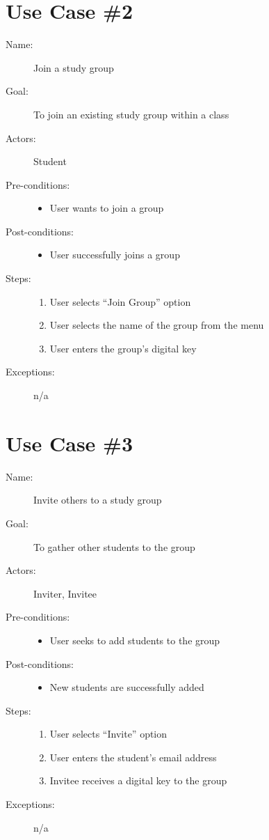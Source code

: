 \section{Use Case \#2}
	\begin{description}
		\item[Name:] Join a study group
		\item[Goal:] To join an existing study group within a class
		\item[Actors:] Student
		\item[Pre-conditions:]
		\begin{itemize}
			\item User wants to join a group
		\end{itemize}
		\item[Post-conditions:]
		\begin{itemize}
			\item User successfully joins a group
		\end{itemize}
		\item[Steps:]
		\begin{enumerate}
			\item User selects “Join Group” option
			\item User selects the name of the group from the menu
			\item User enters the group’s digital key
		\end{enumerate}
		\item[Exceptions:] n/a		
	\end{description}
	
\section{Use Case \#3}
	\begin{description}
		\item[Name:] Invite others to a study group
		\item[Goal:] To gather other students to the group
		\item[Actors:] Inviter, Invitee
		\item[Pre-conditions:]
		\begin{itemize}
			\item User seeks to add students to the group
		\end{itemize}
		\item[Post-conditions:]
		\begin{itemize}
			\item New students are successfully added
		\end{itemize}
		\item[Steps:]
		\begin{enumerate}
			\item User selects “Invite” option
			\item User enters the student’s email address
			\item Invitee receives a digital key to the group
		\end{enumerate}
		\item[Exceptions:] n/a		
	\end{description}

